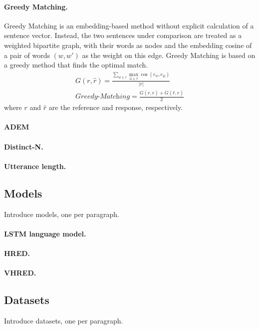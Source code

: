 \documentclass[runningheads]{llncs}
\begin{document}
    \paragraph{Greedy Matching.}
    Greedy Matching \cite{GreedyAndOptimal} is an embedding-based method without explicit calculation of a sentence vector. Instead, the two sentences under comparison are treated as a weighted bipartite graph, with their words as nodes and the embedding cosine of a pair of words $(w, w')$ as the weight on this edge. Greedy Matching is based on a greedy method that finds the optimal match.
    \begin{align}
        G(r, \hat{r}) = \frac{
        \sum_{w \in r} \max_{\hat{w} \in \hat{r}} \cos(e_w, e_{\hat{w}})
        }{ |r| } \\
        \textit{Greedy-Matching} = \frac{
        G(r, \hat{r}) + G(\hat{r}, r)
        }{2}
    \end{align}
    where $r$ and $\hat{r}$ are the reference and response, respectively.

    \paragraph{ADEM}

    \paragraph{Distinct-N.}
    \paragraph{Utterance length.}

    \subsection{Models}
    Introduce models, one per paragraph.
    \paragraph{LSTM language model.}
    \paragraph{HRED.}
    \paragraph{VHRED.}

    \subsection{Datasets}
    Introduce datasets, one per paragraph.
\end{document}
